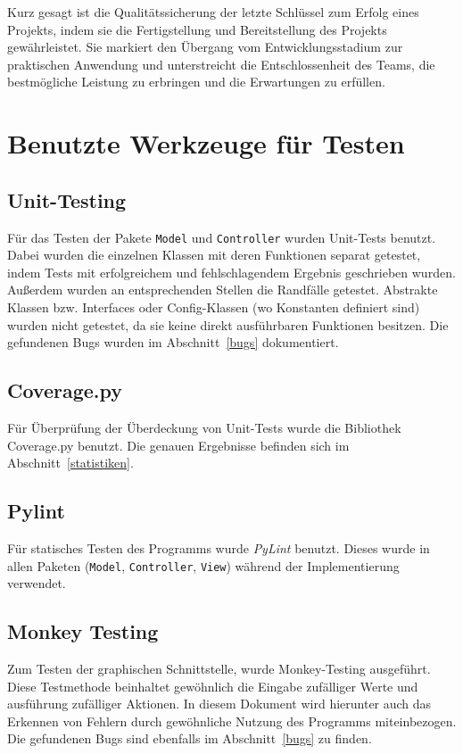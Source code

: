 \documentclass{article}
\begin{document}
Kurz gesagt ist die Qualitätssicherung der letzte Schlüssel zum Erfolg eines Projekts, indem sie die Fertigstellung und Bereitstellung des Projekts gewährleistet. Sie markiert den Übergang vom Entwicklungsstadium zur praktischen Anwendung und unterstreicht die Entschlossenheit des Teams, die bestmögliche Leistung zu erbringen und die Erwartungen zu erfüllen.


\newpage
\section{Benutzte Werkzeuge für Testen} %
\subsection*{Unit-Testing}
Für das Testen der Pakete \texttt{Model} und \texttt{Controller} wurden Unit-Tests benutzt. Dabei wurden die einzelnen Klassen mit deren Funktionen separat getestet, indem Tests mit erfolgreichem und fehlschlagendem Ergebnis geschrieben wurden. Außerdem wurden an entsprechenden Stellen die Randfälle getestet. Abstrakte Klassen bzw. Interfaces oder Config-Klassen (wo Konstanten definiert sind) wurden nicht getestet, da sie keine direkt ausführbaren Funktionen besitzen. Die gefundenen Bugs wurden im Abschnitt~\ref{bugs} dokumentiert.
\subsection*{Coverage.py}
Für Überprüfung der Überdeckung von Unit-Tests wurde die Bibliothek Coverage.py benutzt. Die genauen Ergebnisse befinden sich im Abschnitt~\ref{statistiken}.
\subsection*{Pylint}
Für statisches Testen des Programms wurde \emph{PyLint} benutzt. Dieses wurde in allen Paketen (\texttt{Model}, \texttt{Controller}, \texttt{View}) während der Implementierung verwendet.
\subsection*{Monkey Testing}
Zum Testen der graphischen Schnittstelle, wurde Monkey-Testing ausgeführt. Diese Testmethode beinhaltet gewöhnlich die Eingabe zufälliger Werte und ausführung zufälliger Aktionen. In diesem Dokument wird hierunter auch das Erkennen von Fehlern durch gewöhnliche Nutzung des Programms miteinbezogen. Die gefundenen Bugs sind ebenfalls im Abschnitt~\ref{bugs} zu finden.
\end{document}
